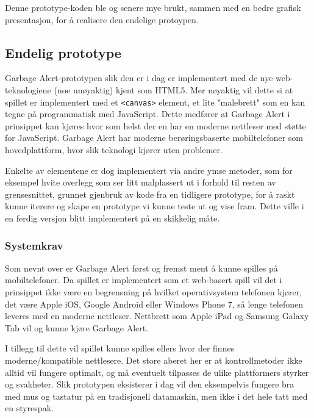 Denne prototype-koden ble og senere mye brukt, sammen med en bedre grafisk presentasjon, for å realisere den endelige protoypen.



\subsection{Endelig prototype}

Garbage Alert-prototypen slik den er i dag er implementert med de nye
web-teknologiene (noe unøyaktig) kjent som HTML5. Mer nøyaktig vil dette si at spillet er implementert med et \texttt{<canvas>} element, et lite "malebrett" som en kan tegne på programmatisk med JavaScript. Dette medfører at Garbage Alert i prinsippet kan kjøres hvor som helst der en har en moderne nettleser med støtte for JavaScript. Garbage Alert har moderne berøringsbaserte mobiltelefoner som hovedplattform, hvor slik teknologi kjører uten problemer.





Enkelte av elementene er dog implementert via andre ymse metoder, som for eksempel hvite overlegg som ser litt malplassert ut i forhold til resten av grensesnittet, grunnet gjenbruk av kode fra en tidligere prototype, for å raskt kunne iterere og skape en prototype vi kunne teste ut og vise fram. Dette ville i en ferdig versjon blitt implementert på en skikkelig måte.


\subsubsection{Systemkrav}
Som nevnt over er Garbage Alert først og fremst ment å kunne spilles på mobiltelefoner.
Da spillet er implementert som et web-basert spill vil det i prinsippet ikke være en begrensning på hvilket operativsystem telefonen kjører, det være Apple iOS, Google Android eller Windows Phone 7, så lenge telefonen leveres med en moderne nettleser. Nettbrett som Apple iPad og Samsung Galaxy Tab vil og kunne kjøre Garbage Alert.

I tillegg til dette vil spillet kunne spilles ellers hvor der finnes moderne/kompatible nettlesere. Det store aberet her er at kontrollmetoder ikke alltid vil fungere optimalt, og må eventuelt tilpasses de ulike plattformers styrker og svakheter. Slik prototypen eksisterer i dag vil den eksempelvis fungere bra med mus og tastatur på en tradisjonell datamaskin, men ikke i det hele tatt med en styrespak.

